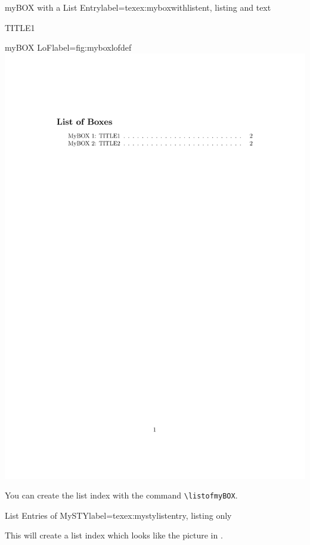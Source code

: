 \documentclass[]{myHOWTO-V001}
\begin{document}
\begin{myTEXEXdoclst}{myBOX with a List Entry}{label={texex:myboxwithlistent}, listing and text}
\begin{myBOXlst}{TITLE1}{}
	\lipsum[4]
\end{myBOXlst}
\end{myTEXEXdoclst}

\begin{minipage}{0.46\linewidth}
\centering
\begin{myFIGlst}{myBOX LoF}{label={fig:myboxlofdef}}
	\includegraphics[page=1,scale=0.18]{examples/myBOXV000.pdf}
\end{myFIGlst}
\end{minipage}
\begin{minipage}{0.46\linewidth}
You can create the list index with the command \Verb|\listofmyBOX|.

\begin{myTEXEXdoclst}{List Entries of MySTY}{label={texex:mystylistentry}, listing only}
\listofmyBOX
\end{myTEXEXdoclst}

This will create a list index which looks like the picture in . 
\end{minipage}
\end{document}
